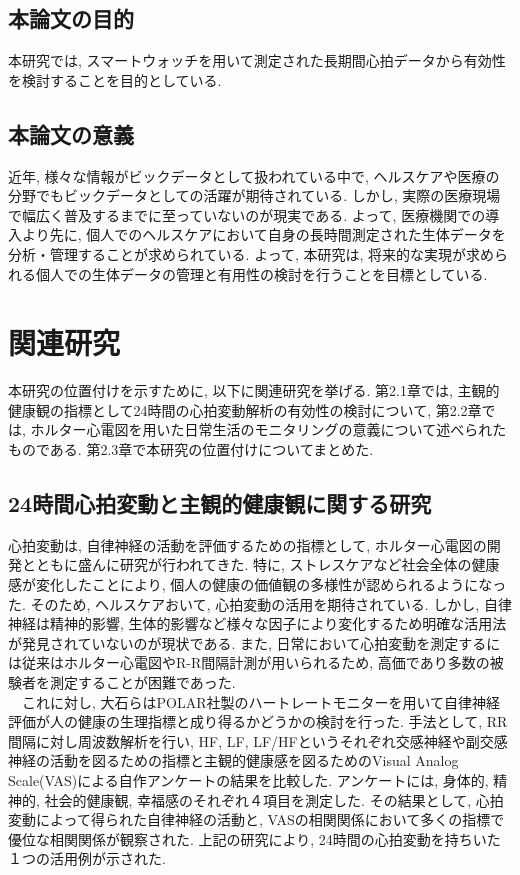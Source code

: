 \documentclass[report, 11pt, a4paper]{jsbook}
\begin{document}
\section{本論文の目的}
本研究では, スマートウォッチを用いて測定された長期間心拍データから有効性を検討することを目的としている. 

\section{本論文の意義}
近年, 様々な情報がビックデータとして扱われている中で, ヘルスケアや医療の分野でもビックデータとしての活躍が期待されている. しかし, 実際の医療現場で幅広く普及するまでに至っていないのが現実である. よって, 医療機関での導入より先に, 個人でのヘルスケアにおいて自身の長時間測定された生体データを分析・管理することが求められている.  
よって, 本研究は, 将来的な実現が求められる個人での生体データの管理と有用性の検討を行うことを目標としている. 


\chapter{関連研究}
本研究の位置付けを示すために, 以下に関連研究を挙げる. 第2.1章では, 主観的健康観の指標として24時間の心拍変動解析の有効性の検討について, 第2.2章では, ホルター心電図を用いた日常生活のモニタリングの意義について述べられたものである. 第2.3章で本研究の位置付けについてまとめた.

\section{24時間心拍変動と主観的健康観に関する研究}
心拍変動は, 自律神経の活動を評価するための指標として, ホルター心電図の開発とともに盛んに研究が行われてきた. 特に, ストレスケアなど社会全体の健康感が変化したことにより, 個人の健康の価値観の多様性が認められるようになった. そのため, ヘルスケアおいて, 心拍変動の活用を期待されている. しかし, 自律神経は精神的影響, 生体的影響など様々な因子により変化するため明確な活用法が発見されていないのが現状である. 
また, 日常において心拍変動を測定するには従来はホルター心電図やR-R間隔計測が用いられるため, 高価であり多数の被験者を測定することが困難であった.\\
~~これに対し, 大石らはPOLAR社製のハートレートモニターを用いて自律神経評価が人の健康の生理指標と成り得るかどうかの検討を行った. 手法として, RR間隔に対し周波数解析を行い, HF, LF, LF/HFというそれぞれ交感神経や副交感神経の活動を図るための指標と主観的健康感を図るためのVisual Analog Scale(VAS)による自作アンケートの結果を比較した. アンケートには, 身体的, 精神的, 社会的健康観, 幸福感のそれぞれ４項目を測定した. その結果として, 心拍変動によって得られた自律神経の活動と, VASの相関関係において多くの指標で優位な相関関係が観察された. 上記の研究により, 24時間の心拍変動を持ちいた１つの活用例が示された. 
	
\end{document}
